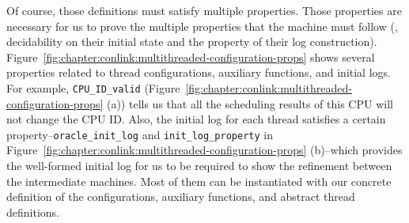 Of course, those definitions must satisfy multiple properties.
Those properties are necessary for us to prove the multiple properties that the machine must follow (\eg, decidability on their initial state and the property of their log construction).
Figure~\ref{fig:chapter:conlink:multithreaded-configuration-props} shows several properties related to thread configurations, auxiliary functions, and initial logs.
For example, 
 \lstinline$CPU_ID_valid$ (Figure~\ref{fig:chapter:conlink:multithreaded-configuration-props} (a))
tells us that all the scheduling results of this CPU 
will not change the CPU ID. 
Also, the initial log for each thread satisfies a certain property--\lstinline$oracle_init_log$ and \lstinline$init_log_property$
in Figure~\ref{fig:chapter:conlink:multithreaded-configuration-props} (b)--which provides the well-formed initial log for us to be required to show the 
refinement between the intermediate machines. 
Most of them can be instantiated with our concrete definition of the configurations, auxiliary functions,
and abstract thread definitions. 




%

